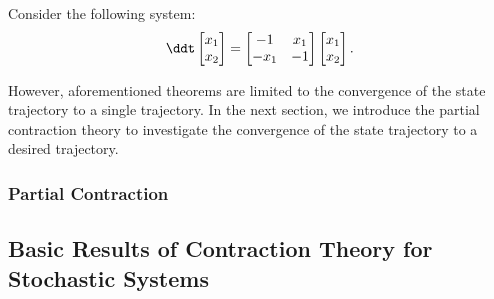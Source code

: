 \hfill

\begin{example}
    Consider the following system:
    \begin{equation}
        \ddt
        \begin{bmatrix}
            x_1\\
            x_2
        \end{bmatrix}
        =
        \begin{bmatrix}
            -1 & x_1\\
            -x_1 & -1
        \end{bmatrix}
        \begin{bmatrix}
            x_1\\
            x_2
        \end{bmatrix}
        .
    \end{equation}
\end{example}

\hfill

However, aforementioned theorems are limited to the convergence of the state trajectory to a single trajectory.
In the next section, we introduce the partial contraction theory to investigate the convergence of the state trajectory to a desired trajectory.

\subsubsection{Partial Contraction}

\cite{Wang:2004aa,Jouffroy:2004aa}

\subsection{Basic Results of Contraction Theory for Stochastic Systems}
